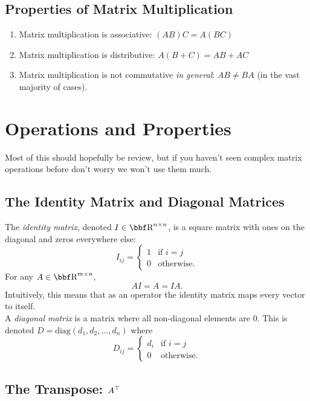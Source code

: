 \documentclass{article}
\begin{document}
\subsection{Properties of Matrix Multiplication}

\begin{enumerate}[-]
    \item Matrix multiplication is associative: $(AB)C = A(BC)$
    \item Matrix multiplication is distributive: $A(B+C) = AB + AC$
    \item Matrix multiplication is not commutative \textit{in general}:
        $AB \neq BA$ (in the vast majority of cases).
\end{enumerate}

\section{Operations and Properties}

Most of this should hopefully be review, but if you haven't seen complex matrix operations
before don't worry we won't use them much.

\subsection{The Identity Matrix and Diagonal Matrices}

The \textit{identity matrix}, denoted $I\in\RR^{n\times n}$, is a square matrix
with ones on the diagonal and zeros everywhere else:
\[
    I_{ij} = \begin{cases} 1 & \text{if $i=j$}\\
        0 & \text{otherwise.}
    \end{cases}
\]
For any $A\in\RR^{m\times n}$,
\[
    AI = A = IA.
\]
Intuitively, this means that as an operator the identity matrix maps every
vector to itself.\\

A \textit{diagonal matrix} is a matrix where all non-diagonal elements are 0.
This is denoted $D=\mathrm{diag}(d_1,d_2,\dots,d_n)$ where
\[
    D_{ij} = \begin{cases}
        d_i & \text{if $i=j$}\\
        0 & \text{otherwise.}
    \end{cases}
\]

\subsection{The Transpose: $A^\top$}
\end{document}

